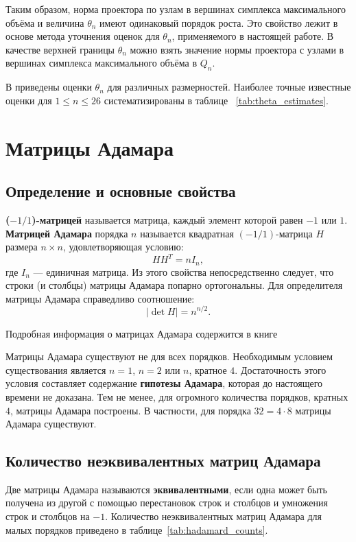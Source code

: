 \documentclass[a4paper,12pt]{article}
\theoremstyle{indented}
\begin{document}
Таким образом, норма проектора по узлам в вершинах симплекса максимального объёма и величина $\theta_n$ имеют одинаковый порядок роста. Это свойство лежит в основе метода уточнения оценок для $\theta_n$, применяемого в настоящей работе. В качестве верхней границы $\theta_n$ можно взять значение нормы проектора с узлами в вершинах симплекса максимального объёма в $Q_n$.
\par
В \cite{nevsky_ukhalov_sel_problems} приведены оценки $\theta_n$ для различных размерностей. Наиболее точные известные оценки для $1 \le n \le 26$ систематизированы в таблице ~\ref{tab:theta_estimates}.
\section{Матрицы Адамара}

\subsection{Определение и основные свойства}

\textbf{($-1/1$)-матрицей} называется матрица, каждый элемент которой равен $-1$ или $1$. \textbf{Матрицей Адамара} порядка $n$ называется квадратная $(-1/1)$-матрица $H$ размера $n \times n$, удовлетворяющая условию:
\[
H H^T = n I_n,
\]
где $I_n$ — единичная матрица. Из этого свойства непосредственно следует, что строки (и столбцы) матрицы Адамара попарно ортогональны. Для определителя матрицы Адамара справедливо соотношение:
\[
|\det H| = n^{n/2}.
\]

Подробная информация о матрицах Адамара содержится в книге \cite{hall_comb_1970}

Матрицы Адамара существуют не для всех порядков. Необходимым условием существования является $n = 1$, $n = 2$ или $n$, кратное $4$. Достаточность этого условия составляет содержание \textbf{гипотезы Адамара}, которая до настоящего времени не доказана. Тем не менее, для огромного количества порядков, кратных $4$, матрицы Адамара построены. В частности, для порядка $32 = 4 \cdot 8$ матрицы Адамара существуют.

\subsection{Количество неэквивалентных матриц Адамара}

Две матрицы Адамара называются \textbf{эквивалентными}, если одна может быть получена из другой с помощью перестановок строк и столбцов и умножения строк и столбцов на $-1$. Количество неэквивалентных матриц Адамара для малых порядков приведено в таблице~\ref{tab:hadamard_counts}.
\end{document}
